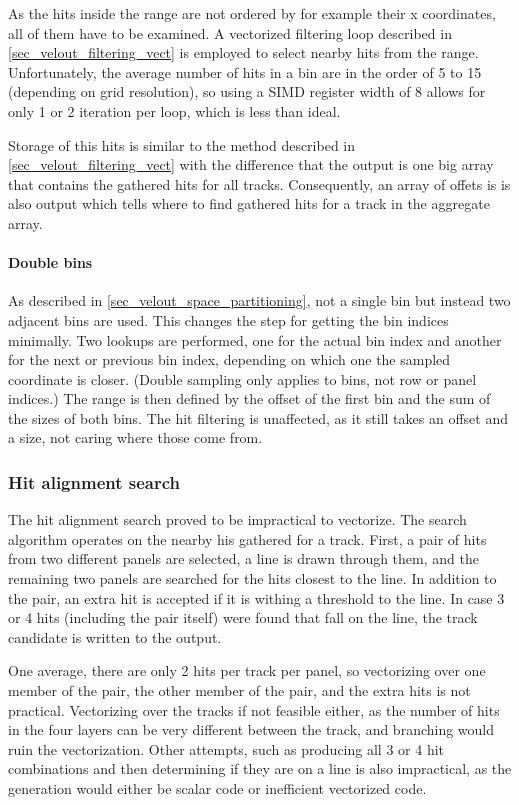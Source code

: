 \documentclass[12pt]{article}
\begin{document}
As the hits inside the range are not ordered by for example their x coordinates, all of them have to be examined. A vectorized filtering loop described in \ref{sec_velout_filtering_vect} is employed to select nearby hits from the range. Unfortunately, the average number of hits in a bin are in the order of 5 to 15 (depending on grid resolution), so using a SIMD register width of 8 allows for only 1 or 2 iteration per loop, which is less than ideal.

Storage of this hits is similar to the method described in \ref{sec_velout_filtering_vect} with the difference that the output is one big array that contains the gathered hits for all tracks. Consequently, an array of offets is is also output which tells where to find gathered hits for a track in the aggregate array.

\paragraph{Double bins}

As described in \ref{sec_velout_space_partitioning}, not a single bin but instead two adjacent bins are used. This changes the step for getting the bin indices minimally. Two lookups are performed, one for the actual bin index and another for the next or previous bin index, depending on which one the sampled coordinate is closer. (Double sampling only applies to bins, not row or panel indices.) The range is then defined by the offset of the first bin and the sum of the sizes of both bins. The hit filtering is unaffected, as it still takes an offset and a size, not caring where those come from.


\subsubsection{Hit alignment search}

The hit alignment search proved to be impractical to vectorize. The search algorithm operates on the nearby his gathered for a track. First, a pair of hits from two different panels are selected, a line is drawn through them, and the remaining two panels are searched for the hits closest to the line. In addition to the pair, an extra hit is accepted if it is withing a threshold to the line. In case 3 or 4 hits (including the pair itself) were found that fall on the line, the track candidate is written to the output.

One average, there are only 2 hits per track per panel, so vectorizing over one member of the pair, the other member of the pair, and the extra hits is not practical. Vectorizing over the tracks if not feasible either, as the number of hits in the four layers can be very different between the track, and branching would ruin the vectorization. Other attempts, such as producing all 3 or 4 hit combinations and then determining if they are on a line is also impractical, as the generation would either be scalar code or inefficient vectorized code.
\end{document}
